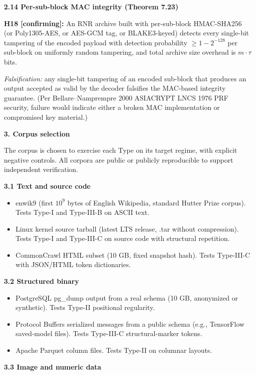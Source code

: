 \documentclass[
]{article}
\begin{document}
\textbf{2.14 Per-sub-block MAC integrity (Theorem 7.23)}

\textbf{H18 {[}confirming{]}:} An RNR archive built with per-sub-block
HMAC-SHA256 (or Poly1305-AES, or AES-GCM tag, or BLAKE3-keyed) detects
every single-bit tampering of the encoded payload with detection
probability $\geq 1 - 2^{-128}$ per sub-block on uniformly random
tampering, and total archive size overhead is $m \cdot \tau$ bits.

\emph{Falsification:} any single-bit tampering of an encoded sub-block
that produces an output accepted as valid by the decoder falsifies
the MAC-based integrity guarantee. (Per Bellare--Namprempre 2000
ASIACRYPT LNCS 1976 PRF security, failure would indicate either a
broken MAC implementation or compromised key material.)

\textbf{3. Corpus selection}

The corpus is chosen to exercise each Type on its target regime, with
explicit negative controls. All corpora are public or publicly
reproducible to support independent verification.

\textbf{3.1 Text and source code}

\begin{itemize}
\item
  enwik9 (first $10^9$ bytes of English Wikipedia, standard Hutter
  Prize corpus). Tests Type-I and Type-III-B on ASCII text.
\item
  Linux kernel source tarball (latest LTS release, .tar without
  compression). Tests Type-I and Type-III-C on source code with
  structural repetition.
\item
  CommonCrawl HTML subset (10 GB, fixed snapshot hash). Tests Type-III-C
  with JSON/HTML token dictionaries.
\end{itemize}

\textbf{3.2 Structured binary}

\begin{itemize}
\item
  PostgreSQL pg\_dump output from a real schema (10 GB, anonymized or
  synthetic). Tests Type-II positional regularity.
\item
  Protocol Buffers serialized messages from a public schema (e.g.,
  TensorFlow saved-model files). Tests Type-III-C structural-marker
  tokens.
\item
  Apache Parquet column files. Tests Type-II on columnar layouts.
\end{itemize}

\textbf{3.3 Image and numeric data}
\end{document}
